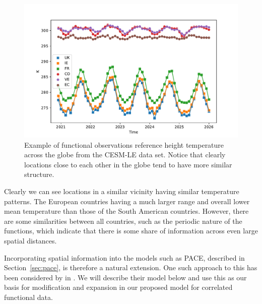  \begin{figure}[htbp!] 
	\centering    
	\includegraphics[width=1.0\textwidth]{TREFHT_example_space_temp}
	\caption[CESM example of spatial correlation]{Example of functional observations reference height temperature across the globe from the CESM-LE data set. Notice that clearly locations close to each other in the globe tend to have more similar structure.}
	\label{fig:cesm-space}
\end{figure}
Clearly we can see locations in a similar vicinity having similar temperature patterns.
The European countries having a much larger range and overall lower mean temperature than those of the South American countries.
However, there are some similarities between all countries, such as the periodic nature of the functions, which indicate that there is some share of information across even large spatial distances. 

Incorporating spatial information into the models such as PACE, described in Section~\ref{sec:pace}, is therefore a natural extension. 
One such approach to this has been considered by \citeauthor{liu_functional_2017} in \citep{liu_functional_2017}. 
We will describe their model below and use this as our basis for modification and expansion in our proposed model for correlated functional data.


